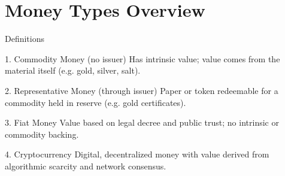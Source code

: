 \documentclass[aspectratio=169, xcolor=table]{beamer}
\begin{document}
\section{Money Types Overview}

\begin{frame}{Definitions}
  \begin{block}{1. Commodity Money (no issuer)}
    Has intrinsic value; value comes from the material itself (e.g. gold, silver, salt).
  \end{block}

  \begin{block}{2. Representative Money (through issuer)}
    Paper or token redeemable for a commodity held in reserve (e.g. gold certificates).
  \end{block}

  \pause %
  \begin{block}{3. Fiat Money}
    Value based on legal decree and public trust; no intrinsic or commodity backing.
  \end{block}


  \pause %
  \begin{block}{4. Cryptocurrency}
    Digital, decentralized money with value derived from algorithmic scarcity and network consensus.
  \end{block}
\end{frame}

\end{document}
